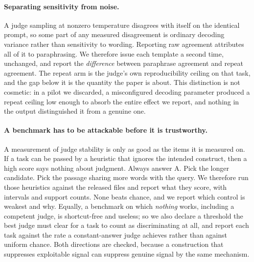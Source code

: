 \paragraph{Separating sensitivity from noise.}
A judge sampling at nonzero temperature disagrees with itself on the identical
prompt, so some part of any measured disagreement is ordinary decoding variance
rather than sensitivity to wording. Reporting raw agreement attributes all of it
to paraphrasing. We therefore issue each template a second time, unchanged, and
report the \emph{difference} between paraphrase agreement and repeat agreement.
The repeat arm is the judge's own reproducibility ceiling on that task, and the
gap below it is the quantity the paper is about. This distinction is not
cosmetic: in a pilot we discarded, a misconfigured decoding parameter produced a
repeat ceiling low enough to absorb the entire effect we report, and nothing in
the output distinguished it from a genuine one.

\paragraph{A benchmark has to be attackable before it is trustworthy.}
A measurement of judge stability is only as good as the items it is measured on.
If a task can be passed by a heuristic that ignores the intended construct, then
a high score says nothing about judgment. Always answer A. Pick the longer
candidate. Pick the passage sharing more words with the query. We therefore
run those heuristics against the released files and report what they score, with
intervals and support counts. None beats chance, and we report which control is
weakest and why. Equally, a benchmark on which \emph{nothing} works,
including a competent judge, is shortcut-free and useless; so we also declare a
threshold the best judge must clear for a task to count as discriminating at
all, and report each task against the rate a constant-answer judge achieves
rather than against uniform chance. Both directions are checked, because a construction that
suppresses exploitable signal can suppress genuine signal by the same mechanism.

